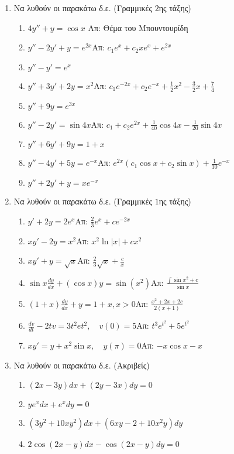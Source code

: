 \documentclass[a4paper,12pt]{article}
\begin{document}
\thispagestyle{empty}
\begin{center}
\end{center}

\vspace{2\baselineskip}

\begin{enumerate}
\item Να λυθούν οι παρακάτω δ.ε. (Γραμμικές $2$ης τάξης) 
\renewcommand{\theenumii}{\roman{enumii}}
\begin{enumerate}
\item $4y''+y=\cos x$ \hfill Απ: Θέμα του Μπουντουρίδη
\item $y''-2y'+y=e^{2x}$\hfill Απ: $c_1e^x+c_2xe^x+e^{2x}$
\item $y''-y'=e^x$
\item $y''+3y'+2y=x^2$\hfill Απ: $c_1e^{-2x}+c_2e^{-x}+\frac{1}{2}x^2-\frac{3}{2}x+\frac{7}{4}$
\item $y''+9y=e^{3x}$
\item $y''-2y'=\sin 4x$\hfill Απ: $c_1+c_2e^{2x}+\frac{1}{40}\cos 4x-\frac{1}{20}\sin 4x$
\item $y''+6y'+9y=1+x$
\item $y''-4y'+5y=e^{-x}$\hfill Απ: $e^{2x}(c_1\cos x+c_2\sin x)+\frac{1}{10}e^{-x}$
\item $y''+2y'+y=xe^{-x}$

\end{enumerate}

\vspace{\baselineskip}

\item Να λυθούν οι παρακάτω δ.ε. (Γραμμικές $1$ης τάξης)

\begin{enumerate}
\item $y'+2y=2e^x$\hfill Απ: $\frac{2}{3}e^x+ce^{-2x}$
\item $xy'-2y=x^2$\hfill Απ: $x^2\ln|x|+cx^2$
\item $xy'+y=\sqrt{x}$\hfill Απ: $\frac{2}{3}\sqrt{x}+\frac{c}{x}$
\item $\sin x\frac{dy}{dx}+(\cos x)y=\sin(x^2)$\hfill Απ: $\frac{\int\sin x^2+c}{\sin x}$
\item $(1+x)\frac{dy}{dx}+y=1+x, x>0$\hfill Απ: $\frac{x^2+2x+2c}{2(x+1)}$
\item $\frac{dv}{dt}-2tv=3t^2e{t^2},\quad v(0)=5$\hfill Απ: $t^3e^{t^2}+5e^{t^2}$
\item $xy'=y+x^2\sin x,\quad y(\pi)=0$\hfill Απ: $-x\cos x-x$
\end{enumerate}

\vspace{\baselineskip}

\item Να λυθούν οι παρακάτω δ.ε. (Ακριβείς)

\begin{enumerate}
\item $(2x-3y)dx+(2y-3x)dy=0$
\item $ye^xdx+e^xdy=0$
\item $(3y^2+10xy^2)dx+(6xy-2+10x^2y)dy$
\item $2\cos(2x-y)dx-\cos(2x-y)dy=0$

\end{enumerate}
\end{enumerate}
\end{document}
